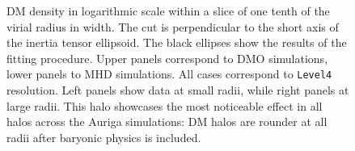 \documentclass[a4paper,fleqn,usenatbib]{mnras}
\begin{document}
\begin{figure}
  \hfill
  \hfill 
  \caption{DM density in logarithmic scale within a slice of one tenth
    of the virial radius in width. 
    The cut is perpendicular to the short axis of the inertia tensor ellipsoid.
    The black ellipses show the results of the fitting procedure. 
    Upper panels correspond to DMO simulations, lower panels to MHD
    simulations.
    All cases correspond to \texttt{Level4} resolution.
    Left panels show data at small radii, while right panels at large
    radii.    
    This halo showcases the most noticeable effect in all halos
    across the Auriga simulations: DM halos are rounder at all radii
    after baryonic physics is included.}
\label{fig:slices}
\end{figure}
\end{document}
